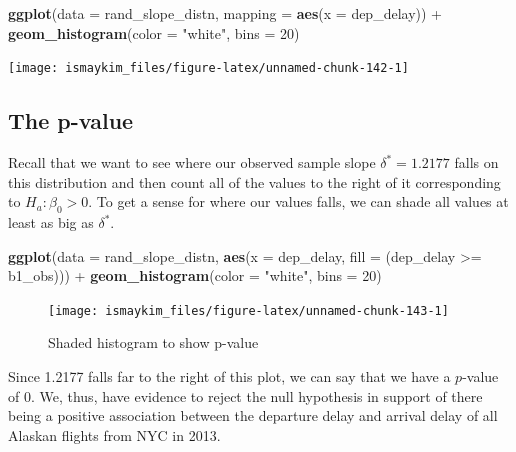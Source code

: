 \documentclass[]{tufte-book}
\newenvironment{Shaded}{\begin{snugshade}}{\end{snugshade}}
\newcommand{\KeywordTok}[1]{\textcolor[rgb]{0.13,0.29,0.53}{\textbf{{#1}}}}
\newcommand{\DataTypeTok}[1]{\textcolor[rgb]{0.13,0.29,0.53}{{#1}}}
\newcommand{\DecValTok}[1]{\textcolor[rgb]{0.00,0.00,0.81}{{#1}}}
\newcommand{\StringTok}[1]{\textcolor[rgb]{0.31,0.60,0.02}{{#1}}}
\newcommand{\NormalTok}[1]{{#1}}
\begin{document}
\begin{Shaded}
\begin{Highlighting}[]
\KeywordTok{ggplot}\NormalTok{(}\DataTypeTok{data =} \NormalTok{rand_slope_distn, }\DataTypeTok{mapping =} \KeywordTok{aes}\NormalTok{(}\DataTypeTok{x =} \NormalTok{dep_delay)) +}
\StringTok{  }\KeywordTok{geom_histogram}\NormalTok{(}\DataTypeTok{color =} \StringTok{"white"}\NormalTok{, }\DataTypeTok{bins =} \DecValTok{20}\NormalTok{)}
\end{Highlighting}
\end{Shaded}

\begin{center}\texttt{[image: ismaykim\_files/figure-latex/unnamed-chunk-142-1]} \end{center}

\subsection{The p-value}\label{the-p-value-2}

Recall that we want to see where our observed sample slope
\(\delta^* = 1.2177\) falls on this distribution and then count all of
the values to the right of it corresponding to \(H_a: \beta_0 > 0\). To
get a sense for where our values falls, we can shade all values at least
as big as \(\delta^*\).

\begin{Shaded}
\begin{Highlighting}[]
\KeywordTok{ggplot}\NormalTok{(}\DataTypeTok{data =} \NormalTok{rand_slope_distn, }\KeywordTok{aes}\NormalTok{(}\DataTypeTok{x =} \NormalTok{dep_delay, }\DataTypeTok{fill =} \NormalTok{(dep_delay >=}\StringTok{ }\NormalTok{b1_obs))) +}
\StringTok{  }\KeywordTok{geom_histogram}\NormalTok{(}\DataTypeTok{color =} \StringTok{"white"}\NormalTok{, }\DataTypeTok{bins =} \DecValTok{20}\NormalTok{)}
\end{Highlighting}
\end{Shaded}

\begin{figure}

{\centering \texttt{[image: ismaykim\_files/figure-latex/unnamed-chunk-143-1]} 

}

\caption[Shaded histogram to show p-value]{Shaded histogram to show p-value}\label{fig:unnamed-chunk-143}
\end{figure}

Since 1.2177 falls far to the right of this plot, we can say that we
have a \(p\)-value of 0. We, thus, have evidence to reject the null
hypothesis in support of there being a positive association between the
departure delay and arrival delay of all Alaskan flights from NYC in
2013.
\end{document}
